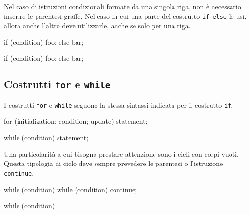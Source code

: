 Nel caso di istruzioni condizionali formate da una singola riga, non è necessario inserire le parentesi graffe.
Nel caso in cui una parte del costrutto \texttt{if-else} le usi, allora anche l'altro deve utilizzarle, anche se solo per una riga.

\begin{minipage}[t]{\cbwidth}
\begin{RightCode}
if (condition)
{
  foo;
}
else
{
  bar;
}
\end{RightCode}
\end{minipage}%
\hspace{\cbdistance}
\begin{minipage}[t]{\cbwidth}
\begin{ErrorCode}
if (condition)
{
  foo;
}
else
  bar;
\end{ErrorCode}
\end{minipage}

\subsection{Costrutti \texttt{for} e \texttt{while}}

I costrutti \texttt{for} e \texttt{while} seguono la stessa sintassi indicata per il costrutto \texttt{if}.

\begin{minipage}[t]{\rbwidth}
\begin{RightCode}
for (initialization; condition; update)
{
  statement;
}

while (condition)
{
  statement;
}
\end{RightCode}
\end{minipage}%

Una particolarità a cui bisogna prestare attenzione sono i cicli con corpi vuoti.
Questa tipologia di ciclo deve sempre prevedere le parentesi o l'istruzione \texttt{continue}.

\begin{minipage}[t]{\cbwidth}
\begin{RightCode}
while (condition) {}
while (condition) continue;
\end{RightCode}
\end{minipage}%
\hspace{\cbdistance}
\begin{minipage}[t]{\cbwidth}
\begin{ErrorCode}
while (condition) ;
\end{ErrorCode}
\end{minipage}


